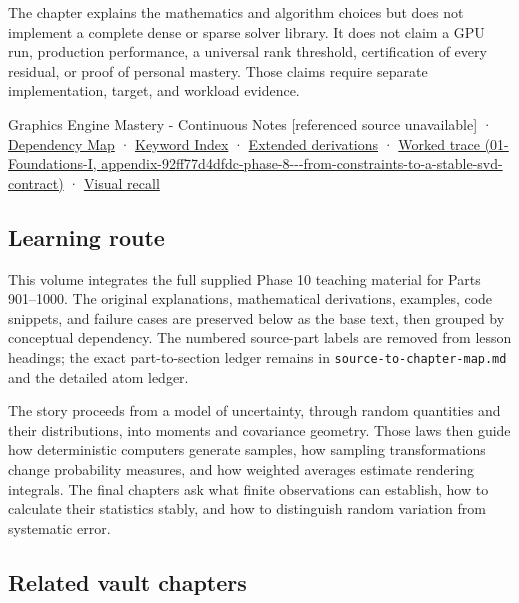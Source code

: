 The chapter explains the mathematics and algorithm choices but does not implement a complete dense or sparse solver library. It does not claim a GPU run, production performance, a universal rank threshold, certification of every residual, or proof of personal mastery. Those claims require separate implementation, target, and workload evidence.

{Graphics Engine Mastery - Continuous Notes {[}referenced source unavailable{]}} · \hyperref[appendix-4ad47bdd269a]{Dependency Map} · \hyperref[appendix-a6d556a4ef50]{Keyword Index} · \hyperref[02-foundations-ii-ch039-phase-8---linear-systems-and-decompositions]{Extended derivations} · \href{../01-Foundations-I/main.pdf\#nameddest=appendix-92ff77d4dfdc-phase-8---from-constraints-to-a-stable-svd-contract}{Worked trace (01-Foundations-I, appendix-92ff77d4dfdc-phase-8-\/-\/-from-constraints-to-a-stable-svd-contract)} · \hyperref[appendix-932cf7182ff1]{Visual recall}

\subsection{Learning route}\label{02-foundations-ii-ch039-learning-route}

This volume integrates the full supplied Phase 10 teaching material for Parts 901--1000. The original explanations, mathematical derivations, examples, code snippets, and failure cases are preserved below as the base text, then grouped by conceptual dependency. The numbered source-part labels are removed from lesson headings; the exact part-to-section ledger remains in \texttt{source-to-chapter-map.md} and the detailed atom ledger.

The story proceeds from a model of uncertainty, through random quantities and their distributions, into moments and covariance geometry. Those laws then guide how deterministic computers generate samples, how sampling transformations change probability measures, and how weighted averages estimate rendering integrals. The final chapters ask what finite observations can establish, how to calculate their statistics stably, and how to distinguish random variation from systematic error.

\subsection{Related vault chapters}\label{02-foundations-ii-ch039-related-vault-chapters}

